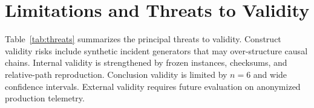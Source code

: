 \section{Limitations and Threats to Validity}
\label{sec:limit}

Table~\ref{tab:threats} summarizes the principal threats to validity. Construct validity risks include synthetic incident generators that may over-structure causal chains. Internal validity is strengthened by frozen instances, checksums, and relative-path reproduction. Conclusion validity is limited by $n{=}6$ and wide confidence intervals. External validity requires future evaluation on anonymized production telemetry.

